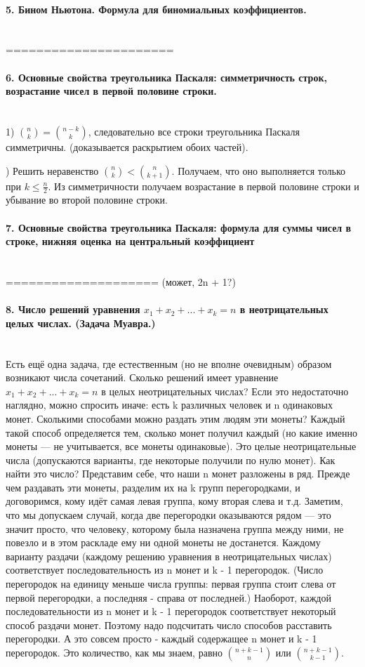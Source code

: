 \documentclass[a4paper, 12pt]{article}
\newcommand{\parag}[1]{\paragraph{#1}\mbox{}\\}
\begin{document}
\parag{5. Бином Ньютона. Формула для биномиальных коэффициентов.}
======================

\parag{6. Основные свойства треугольника Паскаля: симметричность строк, возрастание чисел в первой половине строки.}
1) ${n \choose k} = {n - k \choose k}$, следовательно все строки треугольника Паскаля симметричны. (доказывается раскрытием обоих частей).

) Решить неравенство ${n \choose k} < {n \choose k + 1}$. Получаем, что оно выполняется только при $k \leqslant \frac{n}{2}$. Из симметричности получаем возрастание в первой половине строки и убывание во второй половине строки.

\parag{7. Основные свойства треугольника Паскаля: формула для суммы чисел в строке, нижняя оценка на центральный коэффициент}
==================== (может, 2n + 1?)

\parag{8. Число решений уравнения $x_{1} + x_{2} + ... + x_{k} = n$ в неотрицательных целых числах. (Задача Муавра.)}
Есть ещё одна задача, где естественным (но не вполне очевидным) образом возникают числа сочетаний. Сколько решений имеет уравнение $x_{1} + x_{2} + ... + x_{k} = n$ в целых неотрицательных числах? Если это недостаточно наглядно, можно спросить иначе: есть k различных человек и n одинаковых монет. Сколькими способами можно раздать этим людям эти монеты? Каждый такой способ определяется тем, сколько монет получил каждый (но какие именно монеты — не учитывается, все монеты одинаковые). Это целые неотрицательные числа (допускаются варианты, где некоторые получили по нулю монет). Как найти это число? Представим себе, что наши n монет разложены в ряд. Прежде чем раздавать эти монеты, разделим их на k групп перегородками, и договоримся, кому идёт самая левая группа, кому вторая слева и т.д. Заметим, что мы допускаем случай, когда две перегородки оказываются рядом — это значит просто, что человеку, которому была назначена группа между ними, не повезло и в этом раскладе ему ни одной монеты не достанется. Каждому варианту раздачи (каждому решению уравнения в неотрицательных числах) соответствует последовательность из n монет и k - 1 перегородок. (Число перегородок на единицу меньше числа группы: первая группа стоит слева от первой перегородки, а последняя - справа от последней.) Наоборот, каждой последовательности из n монет и k - 1 перегородок соответствует некоторый способ раздачи монет. Поэтому надо подсчитать число способов расставить перегородки. А это совсем просто - каждый содержащее n монет и k - 1 перегородок. Это количество, как мы знаем, равно ${n + k - 1 \choose n}$ или ${n + k - 1 \choose k - 1}$.
\end{document}
